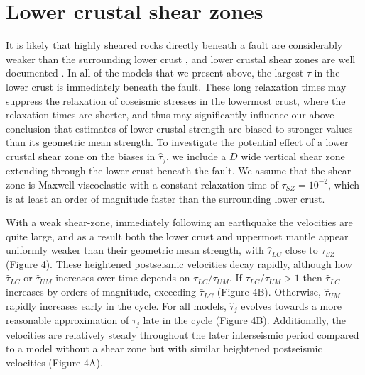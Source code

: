 \section{Lower crustal shear zones}

It is likely that highly sheared rocks directly beneath a fault are
considerably weaker than the surrounding lower crust
\citep[e.g.,][]{Montesi2003}, and lower crustal shear zones are well
documented \citep[e.g.,][]{Vauchez2003}. In all of the models that we
present above, the largest $\tau$ in the lower crust is immediately
beneath the fault.  These long relaxation times may suppress the
relaxation of coseismic stresses in the lowermost crust, where the
relaxation times are shorter, and thus may significantly influence our
above conclusion that estimates of lower crustal strength are biased
to stronger values than its geometric mean strength. To investigate
the potential effect of a lower crustal shear zone on the biases in
$\hat{\tau}_j$, we include a $D$ wide vertical shear zone extending
through the lower crust beneath the fault.  We assume that the shear
zone is Maxwell viscoelastic with a constant relaxation time of
$\tau_{SZ} = 10^{-2}$, which is at least an order of magnitude faster
than the surrounding lower crust.

With a weak shear-zone, immediately following an earthquake the
velocities are quite large, and as a result both the lower crust and
uppermost mantle appear uniformly weaker than their geometric mean
strength, with $\hat{\tau}_{LC}$ close to $\tau_{SZ}$ (Figure 4).
These heightened postseismic velocities decay rapidly, although how
$\hat{\tau}_{LC}$ or $\hat{\tau}_{UM}$ increases over time depends on
$\bar{\tau}_{LC}/\bar{\tau}_{UM}$. If $\bar{\tau}_{LC}/\bar{\tau}_{UM}
> 1$ then $\hat{\tau}_{LC}$ increases by orders of magnitude,
exceeding $\bar{\tau}_{LC}$ (Figure 4B).  Otherwise, $\hat{\tau}_{UM}$
rapidly increases early in the cycle. For all models, $\hat{\tau}_j$
evolves towards a more reasonable approximation of $\bar{\tau}_j$ late
in the cycle (Figure 4B). Additionally, the velocities are relatively
steady throughout the later interseismic period compared to a model
without a shear zone but with similar heightened postseismic
velocities (Figure 4A).

